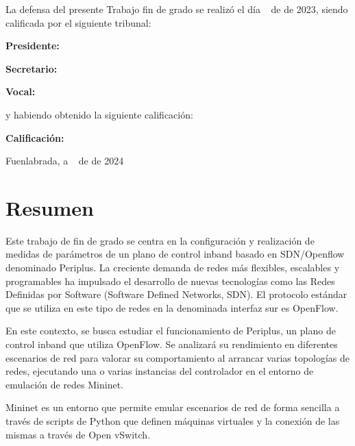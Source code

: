 \documentclass[a4paper, 12pt]{book}
\begin{document}
	\vspace{1cm}
	La defensa del presente Trabajo fin de grado se realizó el día \qquad$\;\,$ de \qquad\qquad\qquad\qquad \newline de 2023, siendo calificada por el siguiente tribunal:
	
	
	\vspace{0.5cm}
	\textbf{Presidente:}
	
	\vspace{1.2cm}
	\textbf{Secretario:}
	
	\vspace{1.2cm}
	\textbf{Vocal:}
	
	
	\vspace{1.2cm}
	y habiendo obtenido la siguiente calificación:
	
	\vspace{1cm}
	\textbf{Calificación:}
	
	
	\vspace{1cm}
	\begin{flushright}
		Fuenlabrada, a \qquad$\;\,$ de \qquad\qquad\qquad\qquad de 2024
	\end{flushright}
	

	
	\chapter*{Resumen}
	Este trabajo de fin de grado se centra en la configuración y realización de medidas de parámetros 
	de un plano de control inband basado en SDN/Openflow denominado Periplus. La
	creciente demanda de redes más flexibles, escalables y programables ha impulsado el desarrollo de 
	nuevas tecnologías como las Redes Definidas por Software (Software Defined Networks, SDN). 
	El protocolo estándar que se utiliza en este tipo de redes en la denominada interfaz sur es
	OpenFlow. 
	
	En este contexto, se busca estudiar el funcionamiento de Periplus, un plano de control  inband que utiliza 
	OpenFlow. Se analizará su rendimiento en diferentes escenarios de red para valorar su comportamiento 
	al arrancar varias topologías de redes, ejecutando una o varias instancias del controlador 
	en el entorno de emulación de redes Mininet.
	
	Mininet es un entorno que permite emular escenarios de red de forma sencilla a través de scripts de 
	Python que definen máquinas virtuales y la conexión de las mismas a través de Open vSwitch.
	
\end{document}
